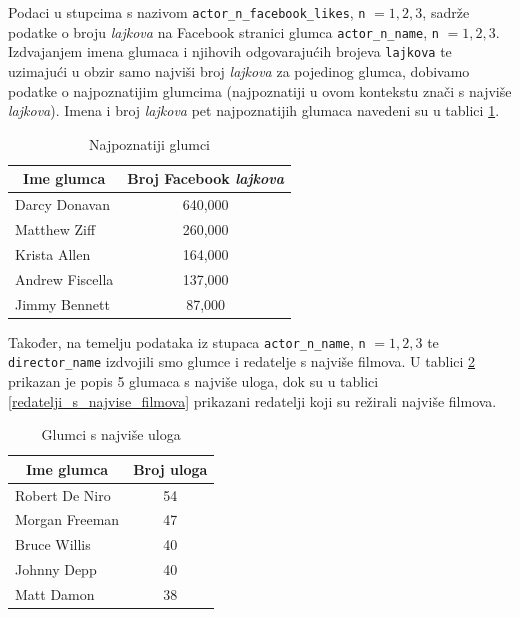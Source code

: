 	 Podaci u stupcima s nazivom \texttt{actor\_n\_facebook\_likes}, \texttt{n} $= 1, 2, 3$,  sadrže podatke o broju \textit{lajkova} na Facebook stranici glumca \texttt{actor\_n\_name}, \texttt{n} $= 1, 2, 3$. Izdvajanjem imena glumaca i njihovih odgovarajućih brojeva \texttt{lajkova} te uzimajući u obzir samo najviši broj \textit{lajkova} za pojedinog glumca, dobivamo podatke o najpoznatijim glumcima (najpoznatiji u ovom kontekstu znači s najviše \textit{lajkova}). Imena i broj \textit{lajkova} pet najpoznatijih glumaca navedeni su u tablici \ref{najpoznatiji_glumci}. 
	 
	 
	 \begin{table}[H]
	 	\centering
	 	\renewcommand{\arraystretch}{1.5} %
	 	\begin{tabular}{|l|c|}
	 		\hline
	 		\multicolumn{1}{|c|}{\textbf{Ime glumca}} & \multicolumn{1}{c|}{\textbf{Broj Facebook \textit{lajkova}}} \\
	 		\hline
	 		Darcy Donavan & 640,000 \\
	 		\hline
	 		Matthew Ziff & 260,000 \\
	 		\hline			
	 		Krista Allen & 164,000 \\
	 		\hline		
	 		Andrew Fiscella & 137,000 \\
	 		\hline		
	 		Jimmy Bennett & 87,000 \\
	 		\hline
	 	\end{tabular}
	 	\caption{Najpoznatiji glumci}
	 	\label{najpoznatiji_glumci}
	 \end{table}
	 
	 Također, na temelju podataka iz stupaca \texttt{actor\_n\_name}, \texttt{n} $= 1, 2, 3$ te \texttt{director\_name} izdvojili smo glumce i redatelje s najviše filmova. U tablici \ref{glumci_s_najvise_uloga} prikazan je popis 5 glumaca s najviše uloga, dok su u tablici \ref{redatelji_s_najvise_filmova} prikazani redatelji koji su režirali najviše filmova.
	 
	  \begin{table}[H]
	 	\centering
	 	\renewcommand{\arraystretch}{1.5} %
	 	\begin{tabular}{|l|c|}
	 		\hline
	 		\multicolumn{1}{|c|}{\textbf{Ime glumca}} & \multicolumn{1}{c|}{\textbf{Broj uloga}} \\
	 		\hline
	 		Robert De Niro & 54 \\
	 		\hline
	 		Morgan Freeman & 47 \\
	 		\hline			
	 		Bruce Willis & 40 \\
	 		\hline		
	 		Johnny Depp & 40 \\
	 		\hline		
	 		Matt Damon	& 38 \\
	 		\hline
	 	\end{tabular}
	 	\caption{Glumci s najviše uloga}
	 	\label{glumci_s_najvise_uloga}
	 \end{table}
	 
